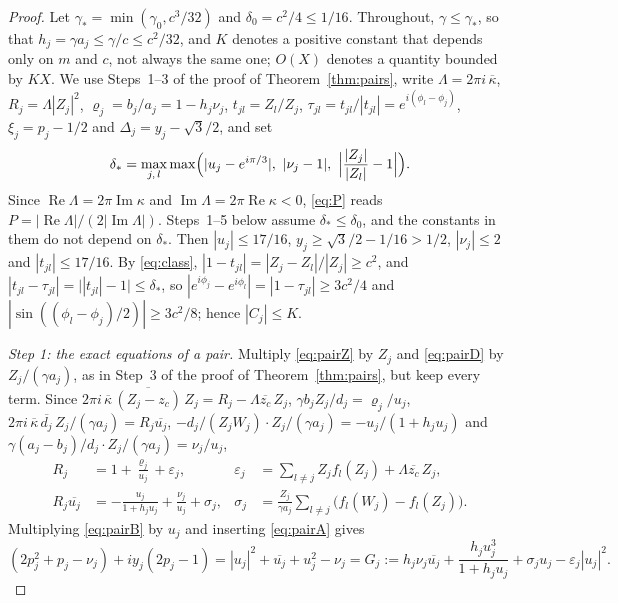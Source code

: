 \documentclass[11pt]{article}
\theoremstyle{definition}
\newcommand{\re}{\operatorname{Re}}
\newcommand{\im}{\operatorname{Im}}
\begin{document}
\begin{proof}
Let $\gamma_* = \min(\gamma_0, c^3/32)$ and $\delta_0 = c^2/4 \le 1/16$. Throughout, $\gamma \le \gamma_*$, so that $h_j = \gamma a_j \le \gamma/c \le c^2/32$, and $K$ denotes a positive constant that depends only on $m$ and $c$, not always the same one; $O(X)$ denotes a quantity bounded by $KX$. We use Steps~1--3 of the proof of Theorem~\ref{thm:pairs}, write $\Lambda = 2\pi i\,\overline{\kappa}$, $R_j = \Lambda|Z_j|^2$, $\varrho_j = b_j/a_j = 1 - h_j\nu_j$, $t_{jl} = Z_l/Z_j$, $\tau_{jl} = t_{jl}/|t_{jl}| = e^{i(\phi_l - \phi_j)}$, $\xi_j = p_j - 1/2$ and $\Delta_j = y_j - \sqrt{3}/2$, and set
\[
  \delta_* = \max_{j,\,l}\max\Bigl(|u_j - e^{i\pi/3}|,\ |\nu_j - 1|,\ \Bigl|\frac{|Z_j|}{|Z_l|} - 1\Bigr|\Bigr).
\]
Since $\re\Lambda = 2\pi\im\kappa$ and $\im\Lambda = 2\pi\re\kappa < 0$, \eqref{eq:P} reads $P = |\re\Lambda|/(2|\im\Lambda|)$. Steps~1--5 below assume $\delta_* \le \delta_0$, and the constants in them do not depend on $\delta_*$. Then $|u_j| \le 17/16$, $y_j \ge \sqrt{3}/2 - 1/16 > 1/2$, $|\nu_j| \le 2$ and $|t_{jl}| \le 17/16$. By \eqref{eq:class}, $|1 - t_{jl}| = |Z_j - Z_l|/|Z_j| \ge c^2$, and $|t_{jl} - \tau_{jl}| = \bigl||t_{jl}| - 1\bigr| \le \delta_*$, so $|e^{i\phi_j} - e^{i\phi_l}| = |1 - \tau_{jl}| \ge 3c^2/4$ and $|\sin((\phi_l - \phi_j)/2)| \ge 3c^2/8$; hence $|C_j| \le K$.

\emph{Step 1: the exact equations of a pair.} Multiply \eqref{eq:pairZ} by $Z_j$ and \eqref{eq:pairD} by $Z_j/(\gamma a_j)$, as in Step~3 of the proof of Theorem~\ref{thm:pairs}, but keep every term. Since $2\pi i\,\overline{\kappa}\,\overline{(Z_j - z_c)}\,Z_j = R_j - \Lambda\overline{z_c}\,Z_j$, $\gamma b_j Z_j/d_j = \varrho_j/u_j$, $2\pi i\,\overline{\kappa}\,\overline{d_j}\,Z_j/(\gamma a_j) = R_j\overline{u_j}$, $-d_j/(Z_jW_j)\cdot Z_j/(\gamma a_j) = -u_j/(1 + h_ju_j)$ and $\gamma(a_j - b_j)/d_j\cdot Z_j/(\gamma a_j) = \nu_j/u_j$,
\begin{align}
  R_j &= 1 + \frac{\varrho_j}{u_j} + \varepsilon_j, & \varepsilon_j &= \sum_{l \ne j} Z_j f_l(Z_j) + \Lambda\overline{z_c}\,Z_j, \label{eq:pairA}\\
  R_j\overline{u_j} &= -\frac{u_j}{1 + h_ju_j} + \frac{\nu_j}{u_j} + \sigma_j, & \sigma_j &= \frac{Z_j}{\gamma a_j}\sum_{l \ne j}\bigl(f_l(W_j) - f_l(Z_j)\bigr). \label{eq:pairB}
\end{align}
Multiplying \eqref{eq:pairB} by $u_j$ and inserting \eqref{eq:pairA} gives
\begin{equation}\label{eq:pairE}
  (2p_j^2 + p_j - \nu_j) + iy_j(2p_j - 1) = |u_j|^2 + \overline{u_j} + u_j^2 - \nu_j = G_j := h_j\nu_j\overline{u_j} + \frac{h_ju_j^3}{1 + h_ju_j} + \sigma_ju_j - \varepsilon_j|u_j|^2.
\end{equation}


\end{proof}
\end{document}
